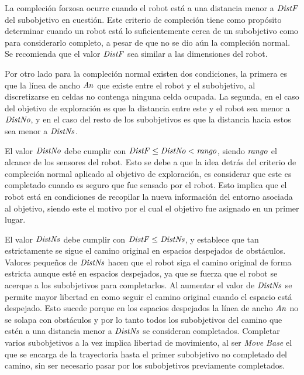 La compleción forzosa ocurre cuando el robot está a una distancia menor a
$\mathit{DistF}$ del subobjetivo en cuestión. Este criterio de compleción tiene como
propósito determinar cuando un robot está lo suficientemente cerca de un subobjetivo
 como para considerarlo completo, a pesar de que no se dio aún la
compleción normal. Se recomienda que el valor $\mathit{DistF}$ sea similar a las
dimensiones del robot.

Por otro lado para la compleción normal existen dos condiciones, la primera es
que la línea de ancho $\mathit{An}$ que existe entre el robot y el subobjetivo,
al discretizarse en celdas no contenga ninguna celda ocupada. La segunda, en el
caso del objetivo de exploración es que la distancia entre este y
el robot sea menor a $\mathit{DistNo}$, y en el caso del resto de los subobjetivos
es que la distancia hacia estos sea menor a $\mathit{DistNs}$.

El valor $\mathit{DistNo}$ debe cumplir con $\mathit{DistF}\leq\mathit{DistNo}<\mathit{rango}$, siendo
$\mathit{rango}$ el alcance de los sensores del robot. Esto se debe a que la idea
detrás del criterio de compleción normal aplicado al objetivo de exploración, es
considerar que este es completado cuando es seguro que fue sensado por el robot.
Esto implica que el robot está en condiciones de recopilar la nueva información
del entorno asociada al objetivo, siendo este el motivo por el cual el objetivo
fue asignado en un primer lugar.

El valor $\mathit{DistNs}$ debe cumplir con $\mathit{DistF}\leq\mathit{DistNs}$, y
establece que tan estrictamente se sigue el camino original en espacios
despejados de obstáculos. Valores pequeños de $\mathit{DistNs}$ hacen que el robot
siga el camino original de forma estricta aunque esté en espacios despejados,
ya que se fuerza que el robot se acerque a los subobjetivos para completarlos.
Al aumentar el valor de $\mathit{DistNs}$ se permite mayor libertad en como seguir
el camino original cuando el espacio está despejado. Esto sucede porque en los
espacios despejados la línea de ancho $\mathit{An}$ no se solapa con obstáculos y
por lo tanto todos los subobjetivos del camino que estén a una distancia menor
a $\mathit{DistNs}$ se consideran completados. Completar varios subobjetivos a la
vez implica libertad de movimiento, al ser \emph{Move Base} el que se encarga
de la trayectoria hasta el primer subobjetivo no completado del camino, sin ser
necesario pasar por los subobjetivos previamente completados.

